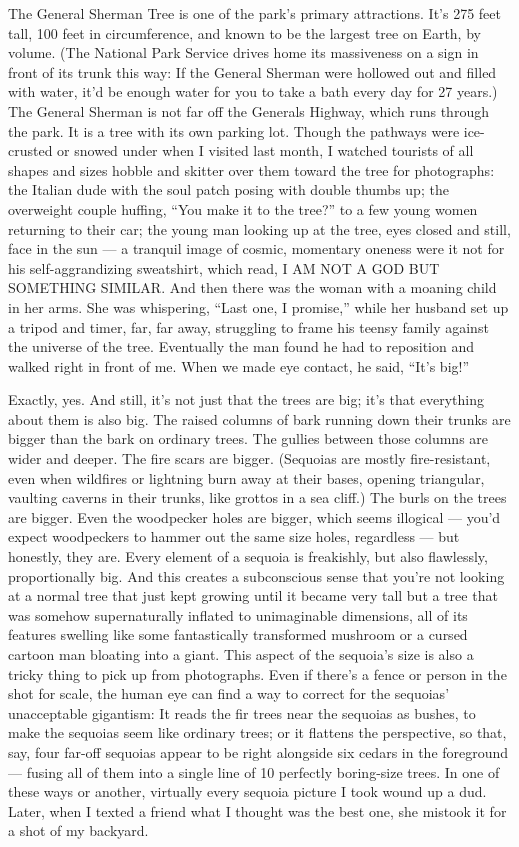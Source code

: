 The General Sherman Tree is one of the park's primary attractions. It's
275 feet tall, 100 feet in circumference, and known to be the largest
tree on Earth, by volume. (The National Park Service drives home its
massiveness on a sign in front of its trunk this way: If the General
Sherman were hollowed out and filled with water, it'd be enough water
for you to take a bath every day for 27 years.) The General Sherman is
not far off the Generals Highway, which runs through the park. It is a
tree with its own parking lot. Though the pathways were ice-crusted or
snowed under when I visited last month, I watched tourists of all shapes
and sizes hobble and skitter over them toward the tree for photographs:
the Italian dude with the soul patch posing with double thumbs up; the
overweight couple huffing, ``You make it to the tree?'' to a few young
women returning to their car; the young man looking up at the tree, eyes
closed and still, face in the sun --- a tranquil image of cosmic,
momentary oneness were it not for his self-aggrandizing sweatshirt,
which read, I AM NOT A GOD BUT SOMETHING SIMILAR. And then there was the
woman with a moaning child in her arms. She was whispering, ``Last one,
I promise,'' while her husband set up a tripod and timer, far, far away,
struggling to frame his teensy family against the universe of the tree.
Eventually the man found he had to reposition and walked right in front
of me. When we made eye contact, he said, ``It's big!''

Exactly, yes. And still, it's not just that the trees are big; it's that
everything about them is also big. The raised columns of bark running
down their trunks are bigger than the bark on ordinary trees. The
gullies between those columns are wider and deeper. The fire scars are
bigger. (Sequoias are mostly fire-resistant, even when wildfires or
lightning burn away at their bases, opening triangular, vaulting caverns
in their trunks, like grottos in a sea cliff.) The burls on the trees
are bigger. Even the woodpecker holes are bigger, which seems illogical
--- you'd expect woodpeckers to hammer out the same size holes,
regardless --- but honestly, they are. Every element of a sequoia is
freakishly, but also flawlessly, proportionally big. And this creates a
subconscious sense that you're not looking at a normal tree that just
kept growing until it became very tall but a tree that was somehow
supernaturally inflated to unimaginable dimensions, all of its features
swelling like some fantastically transformed mushroom or a cursed
cartoon man bloating into a giant. This aspect of the sequoia's size is
also a tricky thing to pick up from photographs. Even if there's a fence
or person in the shot for scale, the human eye can find a way to correct
for the sequoias' unacceptable gigantism: It reads the fir trees near
the sequoias as bushes, to make the sequoias seem like ordinary trees;
or it flattens the perspective, so that, say, four far-off sequoias
appear to be right alongside six cedars in the foreground --- fusing all
of them into a single line of 10 perfectly boring-size trees. In one of
these ways or another, virtually every sequoia picture I took wound up a
dud. Later, when I texted a friend what I thought was the best one, she
mistook it for a shot of my backyard.

